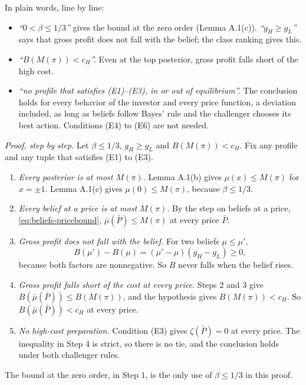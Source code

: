 In plain words, line by line:
\begin{itemize}
\item \emph{``\(0<\beta\le1/3\)''} gives the bound at the zero order (Lemma A.1(c)). \emph{``\(g_H\ge g_L\)''} says that gross profit does not fall with the belief; the class ranking gives this.
\item \emph{``\(B(M(\pi))<c_H\)''.} Even at the top posterior, gross profit falls short of the high cost.
\item \emph{``no profile that satisfies (E1)--(E3), in or out of equilibrium''.} The conclusion holds for every behavior of the investor and every price function, a deviation included, as long as beliefs follow Bayes' rule and the challenger chooses its best action. Conditions (E4) to (E6) are not needed.
\end{itemize}

\emph{Proof, step by step.} Let \(\beta\le1/3\), \(g_H\ge g_L\) and \(B(M(\pi))<c_H\). Fix any profile and any tuple that satisfies (E1) to (E3).
\begin{enumerate}
\item \emph{Every posterior is at most \(M(\pi)\).} Lemma A.1(b) gives \(\mu(x)\le M(\pi)\) for \(x=\pm1\). Lemma A.1(c) gives \(\mu(0)\le M(\pi)\), because \(\beta\le1/3\).
\item \emph{Every belief at a price is at most \(M(\pi)\).} By the step on beliefs at a price, \eqref{eq:beliefs-pricebound}, \(\bar\mu(\bar P)\le M(\pi)\) at every price \(\bar P\).
\item \emph{Gross profit does not fall with the belief.} For two beliefs \(\mu\le\mu'\),
\[
B(\mu')-B(\mu)=(\mu'-\mu)(g_H-g_L)\ge0,
\]
because both factors are nonnegative. So \(B\) never falls when the belief rises.
\item \emph{Gross profit falls short of the cost at every price.} Steps 2 and 3 give \(B(\bar\mu(\bar P))\le B(M(\pi))\), and the hypothesis gives \(B(M(\pi))<c_H\). So \(B(\bar\mu(\bar P))<c_H\) at every price.
\item \emph{No high-cost preparation.} Condition (E3) gives \(\zeta(\bar P)=0\) at every price. The inequality in Step 4 is strict, so there is no tie, and the conclusion holds under both challenger rules.
\end{enumerate}
The bound at the zero order, in Step 1, is the only use of \(\beta\le1/3\) in this proof.

